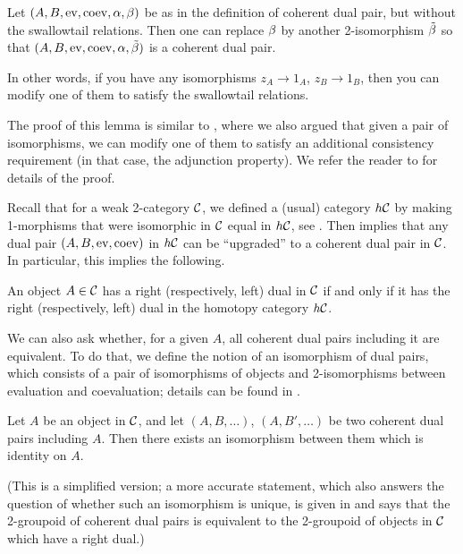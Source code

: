 \begin{lemma}\label{l:dual-pair-upgrade}
  Let $(A, B, \operatorname{ev}, \operatorname{coev}, \alpha, \beta)$ be as in the definition of
  coherent dual pair, but without the swallowtail relations.
  Then one can replace $\beta$ by another
  2-isomorphism $\tilde {\beta}$ so that
  $(A, B, \operatorname{ev}, \operatorname{coev}, \alpha, \tilde {\beta})$ is a coherent dual pair.
\end{lemma}

In other words, if you have any isomorphisms $z_A\to 1_A$, $z_B\to 1_B$,
then you can modify one of them to satisfy the swallowtail relations.

The proof of this lemma is similar to , where
we also argued that given a pair of isomorphisms, we can modify one of them
to satisfy an additional consistency requirement (in that case, the adjunction
property). We refer the reader to \cite[Theorem 2.7]{pstragowski} for
details of the proof.

Recall that for a weak 2-category $\mathcal{C}$, we defined a (usual) category
$h\mathcal{C}$ by making 1-morphisms that were isomorphic in $\mathcal{C}$ equal in
$h\mathcal{C}$, see . Then  implies that
any dual pair $(A,B, \operatorname{ev}, \operatorname{coev})$ in $h\mathcal{C}$ can be ``upgraded'' to a
coherent dual pair in $\mathcal{C}$. In particular, this implies the following.

\begin{corollary}\label{c:dual-objects-2cat}
  An object $A\in \mathcal{C}$ has a right \textup{(}respectively, left\textup{)} dual in $\mathcal{C}$
  if and only if it has the right \textup{(}respectively, left\textup{)}
  dual in the homotopy category $h\mathcal{C}$.
\end{corollary}

We can also ask whether, for a given $A$, all coherent dual pairs
including it are equivalent. To do that, we define the notion of
an isomorphism of dual pairs, which consists of a pair of isomorphisms of
objects and 2-isomorphisms between evaluation and coevaluation; details
can be found in \cite[Section 2.2]{pstragowski}.


\begin{theorem}\label{t:coh-dual-pair-unique}
    Let $A$ be an object in $\mathcal{C}$, and let $(A,B, \dots)$,
    $(A, B', \dots)$ be two coherent dual pairs including $A$.
    Then there exists an isomorphism between them which is identity on $A$.
\end{theorem}

(This is a simplified version; a more accurate statement, which also
answers the question of whether such an isomorphism is unique, is given
in \cite[Theorem 2.14]{pstragowski} and says that the 2-groupoid of
coherent dual pairs is equivalent to the 2-groupoid of
objects in $\mathcal{C}$ which have a right dual.)


